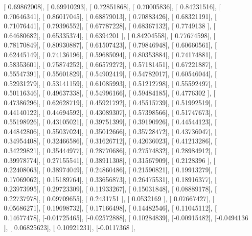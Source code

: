 \documentclass{article}
\begin{document}
       [ 0.69862008],
       [ 0.69910293],
       [ 0.72851868],
       [ 0.70005836],
       [ 0.84231516],
       [ 0.70646341],
       [ 0.86017045],
       [ 0.68879013],
       [ 0.70883426],
       [ 0.68321191],
       [ 0.71076441],
       [ 0.79396552],
       [ 0.67787228],
       [ 0.68367132],
       [ 0.7749138 ],
       [ 0.64680682],
       [ 0.65335374],
       [ 0.6394201 ],
       [ 0.84204558],
       [ 0.77674598],
       [ 0.78170849],
       [ 0.80930887],
       [ 0.61507423],
       [ 0.79846948],
       [ 0.60660561],
       [ 0.62445149],
       [ 0.74136196],
       [ 0.59685094],
       [ 0.80353884],
       [ 0.74174881],
       [ 0.58353601],
       [ 0.75874252],
       [ 0.66579272],
       [ 0.57181451],
       [ 0.67221887],
       [ 0.55547391],
       [ 0.55601829],
       [ 0.54902419],
       [ 0.54782017],
       [ 0.60546044],
       [ 0.52931279],
       [ 0.53141159],
       [ 0.61085993],
       [ 0.51212798],
       [ 0.55592497],
       [ 0.50116346],
       [ 0.49637338],
       [ 0.54996166],
       [ 0.59484185],
       [ 0.4776302 ],
       [ 0.47386296],
       [ 0.62628719],
       [ 0.45921792],
       [ 0.45515739],
       [ 0.51992519],
       [ 0.44140122],
       [ 0.44694592],
       [ 0.43089307],
       [ 0.57398566],
       [ 0.51747673],
       [ 0.55198926],
       [ 0.43105021],
       [ 0.39751399],
       [ 0.39190926],
       [ 0.44544123],
       [ 0.44842806],
       [ 0.55037024],
       [ 0.35012666],
       [ 0.35728472],
       [ 0.43736047],
       [ 0.34954408],
       [ 0.32466586],
       [ 0.31626712],
       [ 0.42036023],
       [ 0.41213286],
       [ 0.34229821],
       [ 0.35444977],
       [ 0.28770686],
       [ 0.27574832],
       [ 0.28984912],
       [ 0.39978774],
       [ 0.27155541],
       [ 0.38911308],
       [ 0.31567909],
       [ 0.2128396 ],
       [ 0.22408063],
       [ 0.38974049],
       [ 0.24860486],
       [ 0.21590821],
       [ 0.19913279],
       [ 0.17069062],
       [ 0.15189764],
       [ 0.33656873],
       [ 0.26475531],
       [ 0.18916377],
       [ 0.23973995],
       [ 0.29723309],
       [ 0.11933267],
       [ 0.15031848],
       [ 0.08889178],
       [ 0.22737978],
       [ 0.09709655],
       [ 0.2431751 ],
       [ 0.0532169 ],
       [ 0.07667427],
       [ 0.05686271],
       [ 0.19698732],
       [ 0.17166498],
       [ 0.14482546],
       [ 0.11045112],
       [ 0.14677478],
       [-0.01725465],
       [-0.02572888],
       [ 0.10284839],
       [-0.00915482],
       [-0.0494136 ],
       [ 0.06825623],
       [ 0.10921231],
       [-0.0117368 ],
\end{document}
